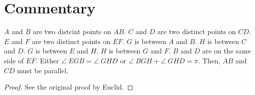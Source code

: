 \section*{Commentary}

\begin{proposition}\label{proposition_28}\leanok
    $A$ and $B$ are two distcint points on $AB$. $C$ and $D$ are two distinct points on $CD$. $E$ and $F$ are two distinct points on $EF$. $G$ is between $A$ and $B$. $H$ is between $C$ and $D$. $G$ is between $E$ and $H$. $H$ is between $G$ and $F$. $B$ and $D$ are on the same side of $EF$. Either $\angle~EGB = \angle~GHD$ or $\angle~BGH + \angle~GHD = \pi$. Then, $AB$ and $CD$ must be parallel.
\end{proposition}
\begin{proof}
    \leanok
    See the original proof by Euclid.
\end{proof}
